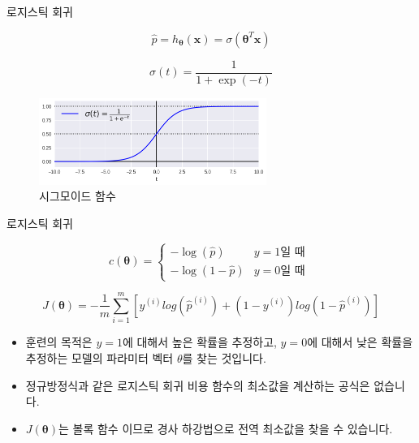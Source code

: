 \documentclass{beamer}
\numberwithin{equation}{section}
\begin{document}

\begin{frame}{로지스틱 회귀}

\begin{equation}
\hat{p} = h_{\boldsymbol{\theta}}(\mathbf{x}) = \sigma(\boldsymbol{\theta}^T \mathbf{x})
\end{equation}

\begin{equation}
\sigma(t) = \dfrac{1}{1 + \exp(-t)}
\end{equation}

\begin{figure}
\includegraphics[width=20em]{./images/sigmoid}
\caption{\label{fig:sigmoid}시그모이드 함수}
\end{figure}

\end{frame}

\begin{frame}{로지스틱 회귀}

\begin{equation}
c(\boldsymbol{\theta}) =
\begin{cases}
    -\log(\hat{p}) & y = 1 \text{일 때 } \\
    -\log(1 - \hat{p}) & y = 0 \text{일 때 }
\end{cases}
\end{equation}

\begin{equation}
J(\boldsymbol{\theta}) = -\dfrac{1}{m} \sum\limits_{i=1}^{m}{\left[ y^{(i)} log\left(\hat{p}^{(i)}\right) + (1 - y^{(i)}) log\left(1 - \hat{p}^{(i)}\right)\right]}
\end{equation}

\begin{itemize}
\item 훈련의 목적은 $y=1$에 대해서 높은 확률을 추정하고, $y=0$에 대해서 낮은 확률을 추정하는 모델의 파라미터 벡터 $\theta$를 찾는 것입니다.
\item 정규방정식과 같은 로지스틱 회귀 비용 함수의 최소값을 계산하는 공식은 없습니다.
\item $J(\boldsymbol{\theta})$는 볼록 함수 이므로 경사 하강법으로 전역 최소값을 찾을 수 있습니다.
\end{itemize}

\end{frame}
\end{document}
